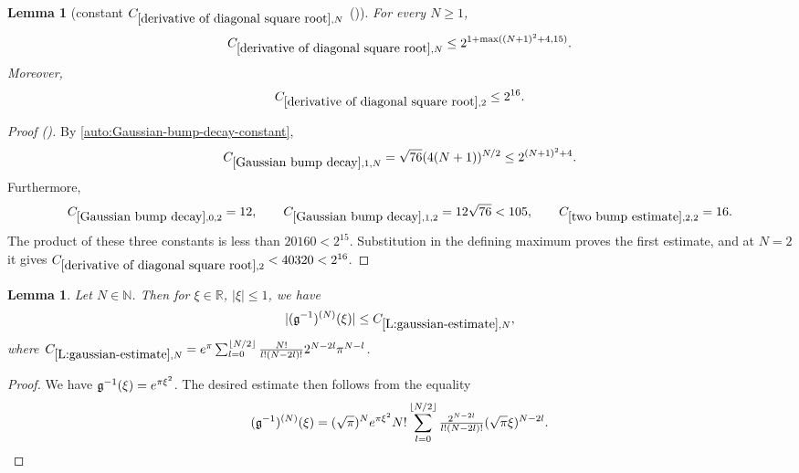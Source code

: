 \documentclass[12pt,reqno]{amsart}
\newcommand{\auto}{{({\tiny\faCar})}}
\theoremstyle{plain}
\newtheorem{lemma}[theorem]{Lemma}
\numberwithin{equation}{section}
\theoremstyle{remark}
\newcommand{\using}[1]{}
\newcommand{\R}{{\mathbb R}}
\newcommand{\N}{{\mathbb N}}
\begin{document}
\begin{lemma}[constant $C_{\ref{derivative of diagonal square root},N}$ \auto]\label{constant derivative diagonal square root}\using{Gaussian bump decay}\using{two bump estimate}\using{derivative of diagonal square root}
For every $N\ge1$,
\begin{equation}\label{constant derivative diagonal square root bound}
C_{\ref{derivative of diagonal square root},N}
\le2^{1+\max((N+1)^2+4,15)}.
\end{equation}
Moreover,
\begin{equation}\label{auto:constant-derivative-diagonal-square-root-two}
C_{\ref{derivative of diagonal square root},2}\le2^{16}.
\end{equation}
\end{lemma}
\begin{proof}[Proof \auto]
By \eqref{auto:Gaussian-bump-decay-constant},
\[
C_{\ref{Gaussian bump decay},1,N}
=\sqrt{76}(4(N+1))^{N/2}
\le2^{(N+1)^2+4}.
\]
Furthermore,
\[
C_{\ref{Gaussian bump decay},0,2}=12,
\qquad
C_{\ref{Gaussian bump decay},1,2}=12\sqrt{76}<105,
\qquad
C_{\ref{two bump estimate},2,2}=16.
\]
The product of these three constants is less than $20160<2^{15}$. Substitution in the defining maximum proves the first estimate, and at $N=2$ it gives $C_{\ref{derivative of diagonal square root},2}<40320<2^{16}$.
\end{proof}


\begin{lemma}\label{L:gaussian-estimate}
Let $N\in \N$. Then for $\xi \in \R$, $|\xi|\leq 1$, we have
\begin{equation}\label{auto:inverse-Gaussian-derivative-bound}
|(\mathfrak{g}^{-1})^{(N)}(\xi)| \leq C_{\ref{L:gaussian-estimate},N},
\end{equation}
where $C_{\ref{L:gaussian-estimate},N}=e^{\pi} \sum_{l=0}^{\lfloor N/2 \rfloor} \frac{N!}{l!(N-2l)!} 2^{N-2l} \pi^{N-l}$.
\end{lemma}

\begin{proof}
We have $\mathfrak{g}^{-1}(\xi)=e^{\pi\xi^2}$. The desired estimate then follows from the equality
\[
(\mathfrak{g}^{-1})^{(N)}(\xi)
=(\sqrt{\pi})^{N} e^{\pi  \xi^2} N!\sum_{l=0}^{\lfloor N/2\rfloor} \tfrac{2^{N-2l}}{l!(N -2l)!} (\sqrt{\pi} \xi)^{N-2l}.
\]
\end{proof}
\end{document}
